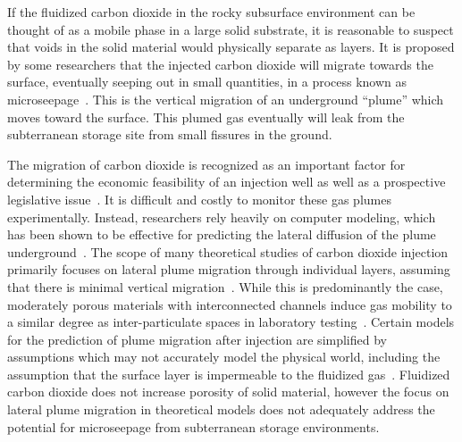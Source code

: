 \documentclass[numbook, envcountsect, envcountsame, envcountreset, runningheads, twocolumn]{svjour3}
\begin{document}
		If the fluidized carbon dioxide in the rocky subsurface environment can be thought of as a mobile phase in a large solid substrate, it is reasonable to suspect that voids in the solid material would physically separate as layers.  It is proposed by some researchers that the injected carbon dioxide will migrate towards the surface, eventually seeping out in small quantities, in a process known as microseepage~\cite{klusman_baseline_2005, klusman_rate_2003, carrroll_geochemical_2009}.  This is the vertical migration of an underground ``plume'' which moves toward the surface.  This plumed gas eventually will leak from the subterranean storage site from small fissures in the ground.  
		
		
		The migration of carbon dioxide is recognized as an important factor for determining the economic feasibility of an injection well as well as a prospective legislative issue~\cite{vandeweijer_monitoring_2011}.  It is difficult and costly to monitor these gas plumes experimentally.  Instead, researchers rely heavily on computer modeling, which has been shown to be effective for predicting the lateral diffusion of the plume underground~\cite{oldenburg_process_2001,zhang_gas_2016}.  The scope of many theoretical studies of carbon dioxide injection primarily focuses on lateral plume migration through individual layers, assuming that there is minimal vertical migration~\cite{singh_numerical_2012}.  While this is predominantly the case, moderately porous materials with interconnected channels induce gas mobility to a similar degree as inter-particulate spaces in laboratory testing~\cite{honari_enhanced_2015}.  Certain models for the prediction of plume migration after injection are simplified by assumptions which may not accurately model the physical world, including the assumption that the surface layer is impermeable to the fluidized gas~\cite{patel_high-fidelity_2016}.   Fluidized carbon dioxide does not increase porosity of solid material, however the focus on lateral plume migration in theoretical models does not adequately address the potential for microseepage from subterranean storage environments.
		
\end{document}

